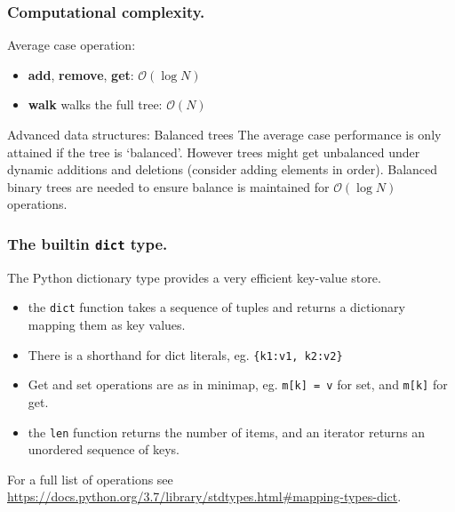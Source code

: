 \documentclass{beamer} %
\newcommand\emc[1]{\textcolor{midred}{\textbf{#1}}}
\begin{document}



\begin{frame}
\frametitle{Computational complexity.}

Average case operation:
\begin{itemize}
  \item \emc{add}, \emc{remove}, \emc{get}: $\mathcal{O}(\log N)$
  \item \emc{walk} walks the full tree: $\mathcal{O}(N)$
\end{itemize}

\vspace{3mm}
\begin{block}{Advanced data structures: Balanced trees}
The average case performance is only attained if the tree is `balanced'. However trees might get unbalanced under dynamic additions and deletions (consider adding elements in order). Balanced binary trees are needed to ensure balance is maintained for $\mathcal{O}(\log N)$ operations.
\end{block}

\end{frame}

\begin{frame}
\frametitle{The builtin \texttt{dict} type.}

The Python dictionary type provides a very efficient key-value store.
\begin{itemize}
  \item the \texttt{dict} function takes a sequence of tuples and returns a dictionary mapping them as key values.
  \item There is a shorthand for dict literals, eg. \texttt{\{k1:v1, k2:v2\}}
  \item Get and set operations are as in minimap, eg. \texttt{m[k] = v} for set, and \texttt{m[k]} for get.
  \item the \texttt{len} function returns the number of items, and an iterator returns an unordered sequence of keys.
\end{itemize}

\vspace{3mm} 
For a full list of operations see \url{https://docs.python.org/3.7/library/stdtypes.html\#mapping-types-dict}.
\end{frame}


\end{document}
